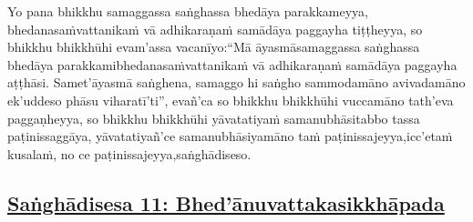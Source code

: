 Yo pana bhikkhu samaggassa saṅghassa bhedāya parakkameyya, bhedanasaṁvattanikaṁ vā adhikaraṇaṁ samādāya paggayha tiṭṭheyya, so bhikkhu bhikkhūhi evam'assa vacanīyo:\makeatletter\hyperlink{endnote66-appendix}\makeatother \thinspace ``Mā āyasmā\makeatletter\hyperlink{endnote67-appendix}\makeatother \thinspace samaggassa saṅghassa bhedāya parakkami\makeatletter\hyperlink{endnote68-appendix}\makeatother \thinspace bhedanasaṁvattanikaṁ vā adhikaraṇaṁ samādāya paggayha aṭṭhāsi. Samet'āyasmā saṅghena, samaggo hi saṅgho sammodamāno avivadamāno ek'uddeso phāsu viharatī'ti'', evañ'ca so bhikkhu bhikkhūhi vuccamāno tath'eva paggaṇheyya, so bhikkhu bhikkhūhi yāvatatiyaṁ samanubhāsitabbo tassa paṭinissaggāya, yāvatatiyañ'ce samanubhāsiyamāno taṁ paṭinissajeyya,\makeatletter\hyperlink{endnote69-appendix}\makeatother \thinspace icc'etaṁ kusalaṁ, no ce paṭinissajeyya,\makeatletter\hyperlink{endnote70-appendix}\makeatother \thinspace saṅghādiseso.



\subsection*{\hyperref[comm11]{Saṅghādisesa 11: Bhed'ānuvattakasikkhāpada}}
\label{sd11}

